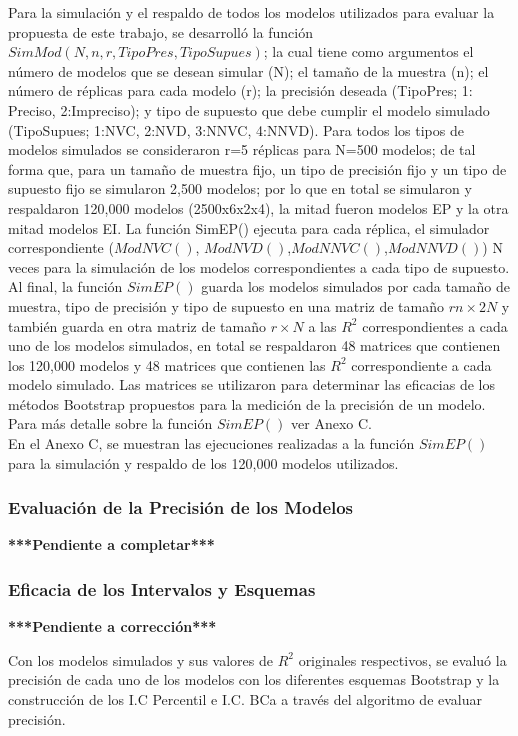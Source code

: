 Para la simulación y el respaldo de todos los modelos utilizados para evaluar la propuesta de este trabajo, se desarrolló la función $SimMod(N,n,r,TipoPres,TipoSupues)$; la cual tiene como argumentos el número de modelos que se desean simular (N); el tamaño de la muestra (n); el número de réplicas para cada modelo (r);  la precisión deseada (TipoPres; 1: Preciso, 2:Impreciso); y tipo de supuesto que debe cumplir el modelo simulado (TipoSupues; 1:NVC, 2:NVD, 3:NNVC, 4:NNVD). Para todos los tipos de modelos simulados se consideraron r=5 réplicas para N=500 modelos; de tal forma que, para un tamaño de muestra fijo, un tipo de precisión fijo y un tipo de supuesto fijo se simularon 2,500 modelos; por lo que en total se simularon y respaldaron 120,000 modelos (2500x6x2x4), la mitad fueron modelos EP y la otra mitad modelos EI.
La función SimEP() ejecuta para cada réplica, el simulador correspondiente ($ModNVC()$, $ModNVD()$,$ ModNNVC()$,$ ModNNVD()$)  N veces para la simulación de los modelos correspondientes a cada tipo de supuesto. Al final, la función $SimEP()$ guarda los modelos simulados por cada tamaño de muestra, tipo de precisión y tipo de supuesto en una matriz de tamaño $rn \times 2N$ y también guarda en otra matriz de tamaño $r \times N$ a las $R^2$ correspondientes a cada uno de los modelos simulados, en total se respaldaron 48 matrices que contienen los 120,000 modelos y 48 matrices que contienen las $R^2$ correspondiente a cada modelo simulado. Las matrices se utilizaron para determinar las eficacias de los métodos Bootstrap propuestos para la medición de la precisión de un modelo. Para más detalle sobre la función $SimEP()$ ver Anexo C.\\

En el Anexo C, se muestran las ejecuciones realizadas a la función $SimEP ()$ para la simulación y respaldo de los 120,000 modelos utilizados. \\


\subsubsection{Evaluación de la Precisión de los Modelos}
\textbf{***Pendiente a completar***}

\subsubsection{Eficacia de los Intervalos y Esquemas}
\textbf{***Pendiente a corrección***}


Con los modelos simulados y sus valores de $R^{2}$ originales respectivos, se evaluó la precisión de cada uno de los modelos con los diferentes esquemas Bootstrap y la construcción de los I.C Percentil e I.C. BCa a través del algoritmo de evaluar precisión.\\


